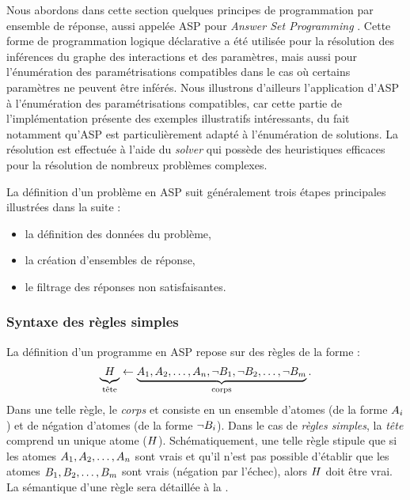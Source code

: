 Nous abordons dans cette section quelques principes de programmation par ensemble de réponse,
aussi appelée ASP pour \textit{Answer Set Programming} \cite{Baral03}.
Cette forme de programmation logique déclarative a été utilisée pour la résolution des inférences
du graphe des interactions et des paramètres, mais aussi pour l'énumération des paramétrisations
compatibles dans le cas où certains paramètres ne peuvent être inférés.
Nous illustrons d'ailleurs l'application d'ASP à l'énumération des paramétrisations
compatibles, car cette partie de l'implémentation présente des exemples illustratifs
intéressants, du fait notamment qu'ASP est particulièrement adapté à l'énumération
de solutions.
La résolution est effectuée à l'aide du \textit{solver}  \cite{gekakasc14b}
qui possède des heuristiques efficaces pour la résolution de nombreux
problèmes complexes.

La définition d'un problème en ASP suit généralement trois étapes principales
illustrées dans la suite :
\begin{itemize}
  \item la définition des données du problème,
  \item la création d'ensembles de réponse,
  \item le filtrage des réponses non satisfaisantes.
\end{itemize}



\subsubsection{Syntaxe des règles simples}

La définition d'un programme en ASP repose sur des règles de la forme :
\begin{align*}
  \underbrace{{\ }H_{\ }}_{\text{tête}} \leftarrow \underbrace{A_1, A_2, \dots,
  A_n, \neg B_1, \neg B_2, \dots, \neg B_m}_{\text{corps}}.
\end{align*}
Dans une telle règle, le \emph{corps} et consiste en un ensemble d'atomes
(de la forme $A_i$) et de négation d'atomes (de la forme $\neg B_i$).
Dans le cas de \emph{règles simples}, la \emph{tête} comprend un unique atome ($H$).
Schématiquement,
une telle règle stipule que si les atomes $A_1, A_2, \dots, A_n$
sont vrais et qu'il n'est pas possible d'établir que les atomes
$B_1, B_2, \dots, B_m$ sont vrais (négation par l'échec),
alors $H$ doit être vrai.
La sémantique d'une règle sera détaillée à la .

